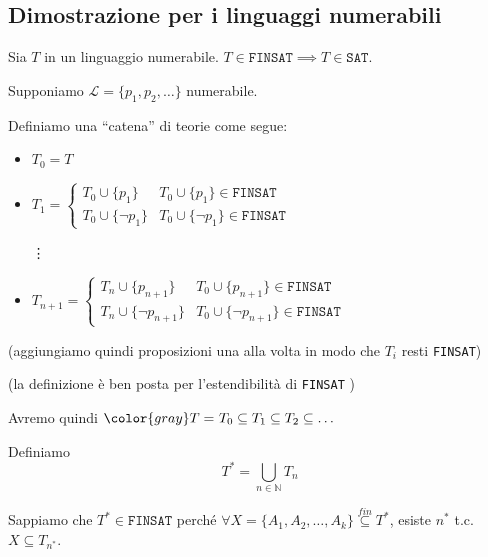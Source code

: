 \documentclass[a4paper,11pt]{report}
\begin{document}
\subsection{Dimostrazione per i linguaggi numerabili}

\begin{gframe}[colframe=DeepGreen, colback=DeepGreenLight]{}
    Sia \( T\) in un linguaggio numerabile. \( T \in \texttt{FINSAT} \implies T\in \texttt{SAT}\).
\end{gframe}

Supponiamo \( \mathcal{L}=\{p_1, p_2, \dots\}\) numerabile. 

Definiamo una ``catena'' di teorie come segue:
\begin{itemize}
    \item \( T_0 = T \)
    \item \( T_1 = \begin{cases}
            T_0 \cup \{p_1\} & T_0 \cup \{p_1\} \in \texttt{FINSAT} \\
            T_0 \cup \{\neg p_1\} & T_0 \cup \{\neg p_1\} \in \texttt{FINSAT}
        \end{cases} \)

        \hspace{1em}\vdots

    \item \( T_{n+1} = \begin{cases}
            T_n \cup \{p_{n+1}\} & T_0 \cup \{p_{n+1}\} \in \texttt{FINSAT} \\
            T_n \cup \{\neg p_{n+1}\} & T_0 \cup \{\neg p_{n+1}\} \in \texttt{FINSAT}
        \end{cases} \)
\end{itemize}

(aggiungiamo quindi proposizioni una alla volta in modo che \( T_i \) resti \texttt{FINSAT})

\begin{gframe}{}
    (la definizione è ben posta per l'estendibilità di \texttt{FINSAT} )
\end{gframe}

Avremo quindi \( {\color{gray} T = }\ T_0 \subseteq T_1 \subseteq T_2 \subseteq \dots \)

Definiamo \[ T^* = \bigcup_{n\in \mathbb{N}} T_n \]

Sappiamo che \( T^* \in \texttt{FINSAT} \) perché \( \forall X = \{A_1, A_2, \dots, A_k\} \overset{fin}{\subseteq} T^*\), esiste \( n^* \) t.c. \( X \subseteq T_{n^*} \).
\end{document}
